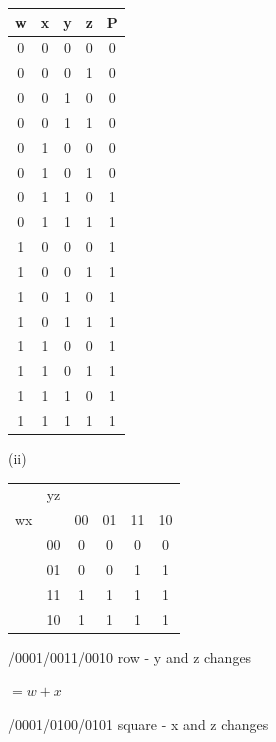 \documentclass{article}
\begin{document}
    \begin{center}
        \begin{tabular} {cccc|c}
            w & x & y & z & P \\
            \hline
            0 & 0 & 0 & 0 & 0 \\
            0 & 0 & 0 & 1 & 0 \\
            0 & 0 & 1 & 0 & 0 \\
            0 & 0 & 1 & 1 & 0 \\
            0 & 1 & 0 & 0 & 0 \\
            0 & 1 & 0 & 1 & 0 \\
            0 & 1 & 1 & 0 & 1 \\
            0 & 1 & 1 & 1 & 1 \\
            1 & 0 & 0 & 0 & 1 \\
            1 & 0 & 0 & 1 & 1 \\
            1 & 0 & 1 & 0 & 1 \\
            1 & 0 & 1 & 1 & 1 \\
            1 & 1 & 0 & 0 & 1 \\
            1 & 1 & 0 & 1 & 1 \\
            1 & 1 & 1 & 0 & 1 \\
            1 & 1 & 1 & 1 & 1 \\
        \end{tabular}
    \end{center}

    \quad\quad (ii)

    \begin{center}
        \begin{tabular} {cc|cccc}
            & yz & &&& \\
            wx && 00 & 01 & 11 & 10 \\
            \hline
            & 00 & 0 & 0 & 0 & 0 \\
            & 01 & 0 & 0 & 1 & 1 \\
            & 11 & 1 & 1 & 1 & 1 \\
            & 10 & 1 & 1 & 1 & 1 \\
        \end{tabular}
    \end{center}

    \quad{}/0001/0011/0010 row - y and z changes 
    
    \quad\quad\quad\quad $=w+x$

    \quad{}/0001/0100/0101 square - x and z changes 
    
\end{document}
